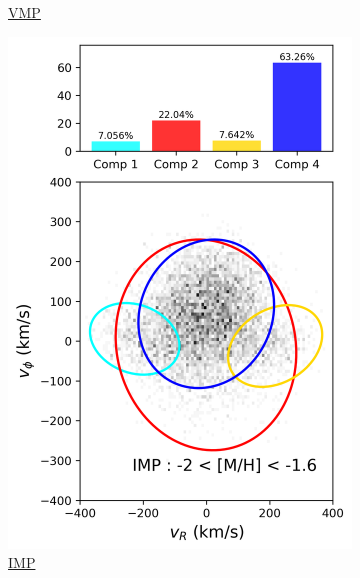 \documentclass[a4paper,12pt]{article}
\begin{document}
\begin{figure}[h]
\begin{subfigure}[t]{0.24\textwidth}
        \caption{\href{https://raw.githack.com/raunaq-rai/Disentangling-the-Milky-Way-using-GMM/main/figures/VMP\_\_-3\%5BM\_H\%5D-2.html}{VMP}}
        \label{fig:gmm_vmp}
    \end{subfigure}\hfill
    \begin{subfigure}[t]{0.24\textwidth}
        \centering
        \includegraphics[width=\linewidth]{../figures/gmm_IMP.png}
        \caption{\href{https://raw.githack.com/raunaq-rai/Disentangling-the-Milky-Way-using-GMM/main/figures/IMP\_\_-2\%5BM\_H\%5D-1.6.html}{IMP}}
        \label{fig:gmm_imp}
    \end{subfigure}\hfill
    \begin{subfigure}[t]{0.24\textwidth}
        \centering

\end{subfigure}
\end{figure}
\end{document}
